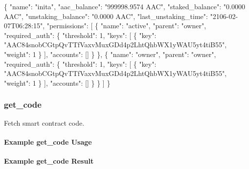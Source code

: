 \begin{DoxyCode}
\{
  \textcolor{stringliteral}{"name"}: \textcolor{stringliteral}{"inita"},
  \textcolor{stringliteral}{"aac\_balance"}: \textcolor{stringliteral}{"999998.9574 AAC"},
  \textcolor{stringliteral}{"staked\_balance"}: \textcolor{stringliteral}{"0.0000 AAC"},
  \textcolor{stringliteral}{"unstaking\_balance"}: \textcolor{stringliteral}{"0.0000 AAC"},
  \textcolor{stringliteral}{"last\_unstaking\_time"}: \textcolor{stringliteral}{"2106-02-07T06:28:15"},
  \textcolor{stringliteral}{"permissions"}: [
    \{
      \textcolor{stringliteral}{"name"}: \textcolor{stringliteral}{"active"},
      \textcolor{stringliteral}{"parent"}: \textcolor{stringliteral}{"owner"},
      \textcolor{stringliteral}{"required\_auth"}: \{
        \textcolor{stringliteral}{"threshold"}: 1,
        \textcolor{stringliteral}{"keys"}: [
          \{
            \textcolor{stringliteral}{"key"}: \textcolor{stringliteral}{"AAC84snobCGtpQvTTfVaxvMuxGDd4p2LhtQhbWX1yWAU5yt4tiB55"},
            \textcolor{stringliteral}{"weight"}: 1
          \}
        ],
        \textcolor{stringliteral}{"accounts"}: []
      \}
    \},
    \{
      \textcolor{stringliteral}{"name"}: \textcolor{stringliteral}{"owner"},
      \textcolor{stringliteral}{"parent"}: \textcolor{stringliteral}{"owner"},
      \textcolor{stringliteral}{"required\_auth"}: \{
        \textcolor{stringliteral}{"threshold"}: 1,
        \textcolor{stringliteral}{"keys"}: [
          \{
            \textcolor{stringliteral}{"key"}: \textcolor{stringliteral}{"AAC84snobCGtpQvTTfVaxvMuxGDd4p2LhtQhbWX1yWAU5yt4tiB55"},
            \textcolor{stringliteral}{"weight"}: 1
          \}
        ],
        \textcolor{stringliteral}{"accounts"}: []
      \}
    \}
  ]
\}
\end{DoxyCode}
\hypertarget{group__aaciorpc_v1chaingetcode}{}\subsubsection{get\+\_\+code}\label{group__aaciorpc_v1chaingetcode}
Fetch smart contract code.\hypertarget{group__aaciorpc_examplegetcode}{}\paragraph{Example get\+\_\+code Usage}\label{group__aaciorpc_examplegetcode}

\hypertarget{group__aaciorpc_examplegetcoderesult}{}\paragraph{Example get\+\_\+code Result}\label{group__aaciorpc_examplegetcoderesult}

